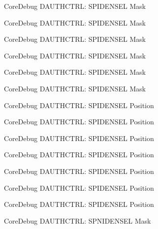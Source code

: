 \begin{DoxyRefList}
\label{deprecated__deprecated000146}%
%
Core\+Debug D\+A\+U\+T\+H\+C\+T\+RL\+: S\+P\+I\+D\+E\+N\+S\+EL Mask 

\label{deprecated__deprecated000222}%
%
Core\+Debug D\+A\+U\+T\+H\+C\+T\+RL\+: S\+P\+I\+D\+E\+N\+S\+EL Mask 

\label{deprecated__deprecated000285}%
%
Core\+Debug D\+A\+U\+T\+H\+C\+T\+RL\+: S\+P\+I\+D\+E\+N\+S\+EL Mask 

\label{deprecated__deprecated000364}%
%
Core\+Debug D\+A\+U\+T\+H\+C\+T\+RL\+: S\+P\+I\+D\+E\+N\+S\+EL Mask 

\label{deprecated__deprecated000440}%
%
Core\+Debug D\+A\+U\+T\+H\+C\+T\+RL\+: S\+P\+I\+D\+E\+N\+S\+EL Mask 

\label{deprecated__deprecated000543}%
%
Core\+Debug D\+A\+U\+T\+H\+C\+T\+RL\+: S\+P\+I\+D\+E\+N\+S\+EL Mask  
\item[Member \mbox{\hyperlink{group__CMSIS__CoreDebug_ga587610b7ac18292de47bf9d675b0b88c}{Core\+Debug\+\_\+\+D\+A\+U\+T\+H\+C\+T\+R\+L\+\_\+\+S\+P\+I\+D\+E\+N\+S\+E\+L\+\_\+\+Pos}} ]\label{deprecated__deprecated000091}%
%
Core\+Debug D\+A\+U\+T\+H\+C\+T\+RL\+: S\+P\+I\+D\+E\+N\+S\+EL Position 

\label{deprecated__deprecated000145}%
%
Core\+Debug D\+A\+U\+T\+H\+C\+T\+RL\+: S\+P\+I\+D\+E\+N\+S\+EL Position 

\label{deprecated__deprecated000221}%
%
Core\+Debug D\+A\+U\+T\+H\+C\+T\+RL\+: S\+P\+I\+D\+E\+N\+S\+EL Position 

\label{deprecated__deprecated000284}%
%
Core\+Debug D\+A\+U\+T\+H\+C\+T\+RL\+: S\+P\+I\+D\+E\+N\+S\+EL Position 

\label{deprecated__deprecated000363}%
%
Core\+Debug D\+A\+U\+T\+H\+C\+T\+RL\+: S\+P\+I\+D\+E\+N\+S\+EL Position 

\label{deprecated__deprecated000439}%
%
Core\+Debug D\+A\+U\+T\+H\+C\+T\+RL\+: S\+P\+I\+D\+E\+N\+S\+EL Position 

\label{deprecated__deprecated000542}%
%
Core\+Debug D\+A\+U\+T\+H\+C\+T\+RL\+: S\+P\+I\+D\+E\+N\+S\+EL Position  
\item[Member \mbox{\hyperlink{group__CMSIS__CoreDebug_gaabb5d6c750c9ec50254134ece2111dcd}{Core\+Debug\+\_\+\+D\+A\+U\+T\+H\+C\+T\+R\+L\+\_\+\+S\+P\+N\+I\+D\+E\+N\+S\+E\+L\+\_\+\+Msk}} ]\label{deprecated__deprecated000088}%
%
Core\+Debug D\+A\+U\+T\+H\+C\+T\+RL\+: S\+P\+N\+I\+D\+E\+N\+S\+EL Mask 


\end{DoxyRefList}
